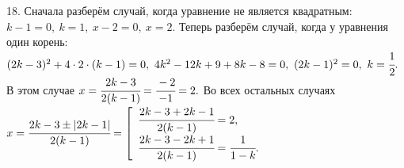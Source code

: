 18. Сначала разберём случай, когда уравнение не является квадратным: $k-1=0,\ k=1,\ x-2=0,\ x=2.$ Теперь разберём случай, когда у уравнения один корень:
$(2k-3)^2+4\cdot2\cdot(k-1)=0,\ 4k^2-12k+9+8k-8=0,\ (2k-1)^2=0,\ k=\cfrac{1}{2}.$ В этом случае $x=\cfrac{2k-3}{2(k-1)}=\cfrac{-2}{-1}=2.$ Во всех остальных случаях $x=\cfrac{2k-3\pm|2k-1|}{2(k-1)}=\left[\begin{array}{l}\cfrac{2k-3+2k-1}{2(k-1)}=2,\\ \cfrac{2k-3-2k+1}{2(k-1)}=\cfrac{1}{1-k}.\end{array}\right.$\\
